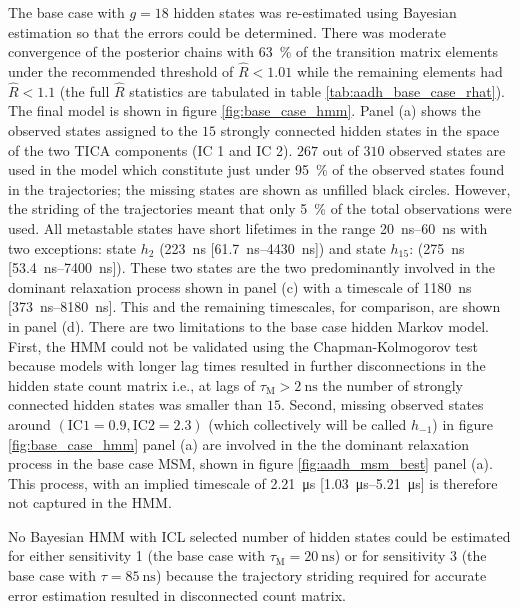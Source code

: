 The base case with $g=18$ hidden states was re-estimated using Bayesian estimation so that the errors could be determined.  There was moderate convergence of the posterior chains with \SI{63}{\percent} of the transition matrix elements under the recommended threshold of $\hat{R}<1.01$ while the remaining elements had $\hat{R}<1.1$ (the full $\hat{R}$ statistics  are tabulated in table \ref{tab:aadh_base_case_rhat}). The final model is shown in figure \ref{fig:base_case_hmm}. Panel (a) shows the observed states assigned to the $15$ strongly connected hidden states in the space of the two TICA components (IC 1 and IC 2). $267$ out of $310$ observed states are used in the model which constitute just under \SI{95}{\percent} of the observed states found in the trajectories; the missing states are shown as unfilled black circles. However, the striding of the trajectories meant that only \SI{5}{\percent} of the total observations were used. All metastable states have short lifetimes in the range \SIrange{20}{60}{\nano\second} with two exceptions: state $h_2$ (\SI{223}{\nano\second} [\SIrange[range-phrase=\text{--}]{61.7}{4430}{\nano\second}]) and state $h_{15}$: (\SI{275}{\nano\second} [\SIrange[range-phrase=\text{--}]{53.4}{7400}{\nano\second}]). These two states are the two predominantly involved in the dominant relaxation process shown in panel (c) with a timescale of \SI{1180}{\nano\second} [\SIrange[range-phrase=\text{--}]{373}{8180}{\nano\second}]. This and the remaining timescales,  for comparison,  are shown in panel (d). 
There are two limitations to the base case hidden Markov model. First, the HMM could not be validated using the Chapman-Kolmogorov test because models with longer lag times resulted in further disconnections in the hidden state count matrix i.e., at lags of $\tau_{\mathrm{M}}> \SI{2}{\nano\second}$ the number of strongly connected hidden states was smaller than $15$. Second, missing observed states around $(\mathrm{IC 1}=0.9, \mathrm{IC 2}=2.3)$ (which collectively will be called $h_{-1}$) in figure \ref{fig:base_case_hmm} panel (a) are involved in the the dominant relaxation process in the  base case MSM, shown in figure \ref{fig:aadh_msm_best} panel (a). This process, with an implied timescale of \SI{2.21}{\micro\second} [\SIrange[range-phrase=\text{--}]{1.03}{5.21}{\micro\second}] is therefore not captured in the HMM.

No Bayesian HMM with ICL selected number of hidden states could be estimated for either sensitivity 1 (the base case with $\tau_{\mathrm{M}}=\SI{20}{\nano\second}$) or for sensitivity 3 (the  base case with $\tau = \SI{85}{\nano\second}$) because the trajectory striding required for accurate error estimation resulted in disconnected count matrix.  

